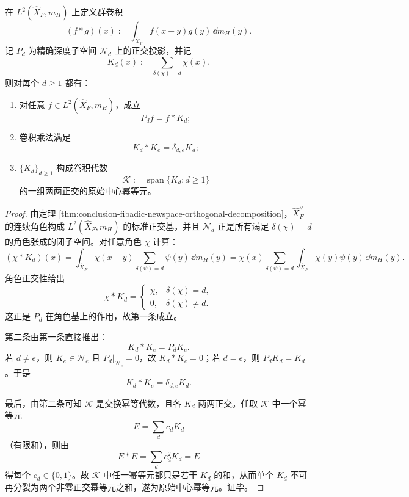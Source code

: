 \begin{theorem}\label{thm:conclusion-fibadic-ramanujan-kernel-convolution-primitive-idempotent}
在 \(L^2(\widehat X_F,m_H)\) 上定义群卷积
\[
(f*g)(x):=\int_{\widehat X_F}f(x-y)g(y)\,\dd m_H(y).
\]
记 \(P_d\) 为精确深度子空间 \(\mathcal N_d\) 上的正交投影，并记
\[
K_d(x):=\sum_{\delta(\chi)=d}\chi(x).
\]
则对每个 \(d\ge 1\) 都有：
\begin{enumerate}
  \item 对任意 \(f\in L^2(\widehat X_F,m_H)\)，成立
  \[
  P_df=f*K_d;
  \]
  \item 卷积乘法满足
  \[
  K_d*K_e=\delta_{d,e}K_d;
  \]
  \item \(\{K_d\}_{d\ge 1}\) 构成卷积代数
  \[
  \mathcal K:=\operatorname{span}\{K_d:d\ge 1\}
  \]
  的一组两两正交的原始中心幂等元。
\end{enumerate}
\end{theorem}
\begin{proof}
由定理 \ref{thm:conclusion-fibadic-newspace-orthogonal-decomposition}，\(\widehat X_F^\vee\) 的连续角色构成 \(L^2(\widehat X_F,m_H)\) 的标准正交基，并且 \(\mathcal N_d\) 正是所有满足 \(\delta(\chi)=d\) 的角色张成的闭子空间。对任意角色 \(\chi\) 计算：
\[
(\chi*K_d)(x)
=
\int_{\widehat X_F}\chi(x-y)\sum_{\delta(\psi)=d}\psi(y)\,\dd m_H(y)
=
\chi(x)\sum_{\delta(\psi)=d}\int_{\widehat X_F}\overline{\chi(y)}\psi(y)\,\dd m_H(y).
\]
角色正交性给出
\[
\chi*K_d=
\begin{cases}
\chi,& \delta(\chi)=d,\\
0,& \delta(\chi)\neq d.
\end{cases}
\]
这正是 \(P_d\) 在角色基上的作用，故第一条成立。

第二条由第一条直接推出：
\[
K_d*K_e=P_dK_e.
\]
若 \(d\neq e\)，则 \(K_e\in \mathcal N_e\) 且 \(P_d|_{\mathcal N_e}=0\)，故 \(K_d*K_e=0\)；若 \(d=e\)，则 \(P_dK_d=K_d\)。于是
\[
K_d*K_e=\delta_{d,e}K_d.
\]

最后，由第二条可知 \(\mathcal K\) 是交换幂等代数，且各 \(K_d\) 两两正交。任取 \(\mathcal K\) 中一个幂等元
\[
E=\sum_{d}c_dK_d
\]
（有限和），则由
\[
E*E=\sum_d c_d^2K_d=E
\]
得每个 \(c_d\in\{0,1\}\)。故 \(\mathcal K\) 中任一幂等元都只是若干 \(K_d\) 的和，从而单个 \(K_d\) 不可再分裂为两个非零正交幂等元之和，遂为原始中心幂等元。证毕。
\end{proof}

